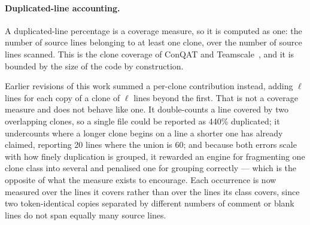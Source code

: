 \documentclass[10pt,a4paper]{article}
\begin{document}
\paragraph{Duplicated-line accounting.} A duplicated-line percentage is a coverage measure, so it is
computed as one: the number of source lines belonging to at least one clone, over the number of source
lines scanned. This is the clone coverage of ConQAT and Teamscale~\cite{conqat}, and it is bounded by
the size of the code by construction.

Earlier revisions of this work summed a per-clone contribution instead, adding $\ell$ lines for each
copy of a clone of $\ell$ lines beyond the first. That is not a coverage measure and does not behave
like one. It double-counts a line covered by two overlapping clones, so a single file could be
reported as 440\% duplicated; it undercounts where a longer clone begins on a line a shorter one has
already claimed, reporting 20 lines where the union is 60; and because both errors scale with how
finely duplication is grouped, it rewarded an engine for fragmenting one clone class into several and
penalised one for grouping correctly --- which is the opposite of what the measure exists to
encourage. Each occurrence is now measured over the lines it covers rather than over the lines its
class covers, since two token-identical copies separated by different numbers of comment or blank
lines do not span equally many source lines.
\end{document}
